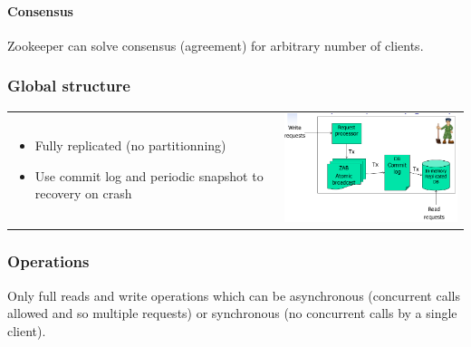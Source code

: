 \paragraph{Consensus}
Zookeeper  can  solve  consensus  (agreement)   for  arbitrary  number  
of  clients.

\subsubsection{Global structure}
\begin{tabular}{m{8cm}m{8cm}}
    \begin{itemize}
        \item Fully replicated (no partitionning)
        \item Use commit log and periodic snapshot to recovery
            on crash
        \end{itemize}
    &
    \includegraphics[width=8cm]{img/zookCompo}
\end{tabular}

\subsubsection{Operations}
Only full reads and write operations which can 
be asynchronous (concurrent calls allowed and so multiple requests) or synchronous
(no concurrent calls by a single client).

